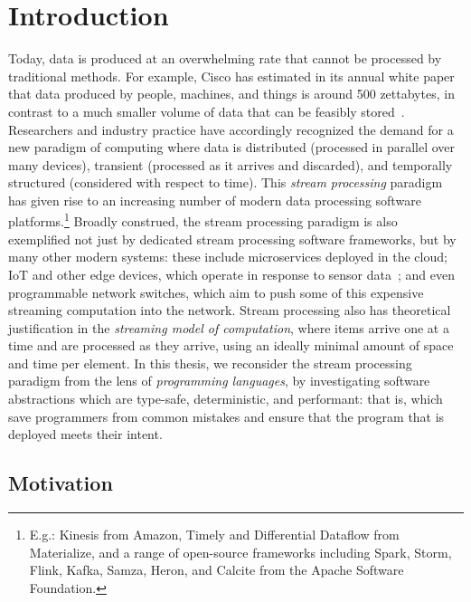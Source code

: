\chapter{Introduction}
\label{cha:intro}

Today, data is produced at an overwhelming rate
that cannot be processed by traditional methods.
For example, Cisco has estimated in its annual white paper
that data produced by people, machines, and things
is around 500 zettabytes, in contrast to a much smaller volume
of data that can be feasibly stored~\cite{index2018forecast}.
Researchers and industry practice have accordingly recognized the demand
for a new paradigm of computing where data is
distributed (processed in parallel over many devices),
transient (processed as it arrives and discarded),
and temporally structured (considered with respect to time).
This \emph{stream processing} paradigm has given rise to an increasing number
of modern data processing software platforms.\footnote{E.g.: Kinesis from Amazon, Timely and Differential Dataflow from Materialize, and a range of open-source frameworks including Spark, Storm, Flink, Kafka, Samza, Heron, and Calcite from the Apache Software Foundation.}
Broadly construed, the stream processing paradigm is also exemplified not just by dedicated stream processing software frameworks, but by many other modern systems: these include microservices deployed in the cloud; IoT and other edge devices, which operate in response
to sensor data~\cite{shi2016edge, ashton2009internet}; and even programmable network switches,
which aim to push some of this expensive streaming computation
into the network.
Stream processing also has theoretical justification in the \emph{streaming model of computation},
where items arrive one at a time and are processed as they arrive, using
an ideally minimal amount of space and time per element.
In this thesis, we reconsider the stream processing paradigm from the lens of \emph{programming languages}, by investigating software abstractions which are type-safe, deterministic, and performant: that is, which save programmers from common mistakes and ensure that the program that is deployed meets their intent.

\section{Motivation}

